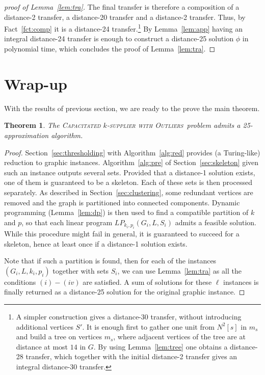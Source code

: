 \documentclass{article}
\newcommand{\fullsup}{\textsc{Capacitated} $k$-\textsc{supplier with Outliers}}
\theoremstyle{plain}
\newtheorem{theorem}{Theorem}
\theoremstyle{definition}
\begin{document}
\begin{proof}[proof of Lemma~\ref{lem:tra}]
The final transfer is therefore a composition
of a distance-2 transfer, a distance-20 transfer and a distance-2 transfer.
Thus, by Fact~\ref{fct:comp} it is a distance-24 transfer.\footnote{A simpler
construction gives a distance-$30$ transfer, without introducing additional
vertices $S'$. It is enough first to gather one unit from $N^2[s]$ in $m_s$ and build 
a tree on vertices $m_s$, where adjacent vertices of the tree are at distance
at most $14$ in $G$. By using Lemma~\ref{lem:tree} one obtains a distance-28 transfer,
which together with the initial distance-2 transfer gives an integral distance-30 transfer.}
By Lemma~\ref{lem:app} having an integral distance-24 transfer
is enough to construct a distance-25 solution $\phi$ in polynomial time,
which concludes the proof of Lemma~\ref{lem:tra}.
\end{proof}

\section{Wrap-up}
\label{sec:wrap-up}

With the results of previous section, we are ready to the prove the
main theorem.
\begin{theorem}\label{thm:gen}
The \fullsup\  problem admits a 25-approximation algorithm.
\end{theorem}
\begin{proof}
Section~\ref{sec:thresholding} with Algorithm~\ref{alg:red} provides (a Turing-like)
reduction to graphic instances. 
Algorithm~\ref{alg:pre} of Section~\ref{sec:skeleton} given such an instance outputs several sets. 
Provided that a distance-1 solution exists, one of them is guaranteed to
be a skeleton. Each of these sets is then processed separately. As described
in Section~\ref{sec:clustering}, some redundant vertices are removed and the graph is
partitioned into connected components. Dynamic programming (Lemma~\ref{lem:dp})
is then used to find a compatible partition of $k$ and $p$, 
so that each linear program $LP_{k_i,p_i}(G_i,L,S_i)$ admits a feasible solution.
While this procedure might fail in general, it is guaranteed to succeed for a skeleton, hence at least once if a distance-1 solution exists. 


Note that if such a partition is found, then for each
of the instances $(G_i,L,k_i,p_i)$ together with sets $S_i$,
we can use Lemma~\ref{lem:tra} as all the conditions $(i)-(iv)$ are satisfied.
A sum of solutions for these $\ell$ instances is finally
returned as a distance-25 solution for the original graphic instance.
\end{proof}
\end{document}

